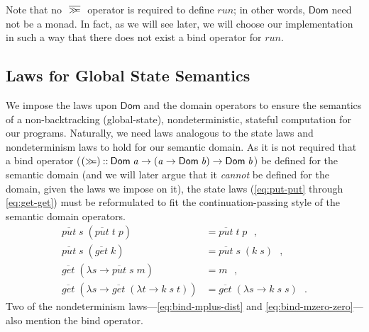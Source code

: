 \documentclass{jfp}
\newcommand{\Conid}[1]{\mathit{#1}}
\newcommand{\Varid}[1]{\mathit{#1}}
\let\Varid\mathit
\let\Conid\mathsf
\begin{document}
Note that no \ensuremath{~\overline{\hstretch{0.7}{>\!\!>\!\!=}}~} operator is required to define \ensuremath{\Varid{run}};
in other words, \ensuremath{\Conid{Dom}} need not be a monad.
In fact, as we will see later, we will choose our implementation in such a way
that there does not exist a bind operator for \ensuremath{\Varid{run}}.

\subsection{Laws for Global State Semantics}
\label{sec:model-global-state-sem}
We impose the laws upon \ensuremath{\Conid{Dom}} and the domain operators to ensure the semantics of a
non-backtracking (global-state),
nondeterministic, stateful computation for our programs.
Naturally, we need laws analogous to the state laws and nondeterminism laws to
hold for our semantic domain.
As it is not required that a bind operator
(\ensuremath{(\mathrel{\hstretch{0.7}{>\!\!>\!\!=}})\mathbin{::}\Conid{Dom}\;\Varid{a}\to (\Varid{a}\to \Conid{Dom}\;\Varid{b})\to \Conid{Dom}\;\Varid{b}}) be defined for the semantic
domain (and we will later argue that it \emph{cannot} be defined for the domain,
given the laws we impose on it), the state laws
(\eqref{eq:put-put} through \eqref{eq:get-get})
must be reformulated to fit the continuation-passing style of the semantic domain
operators.
\begin{align}
  \ensuremath{\overline{\Varid{put}}\;\Varid{s}\;(\overline{\Varid{put}}\;\Varid{t}\;\Varid{p})} &= \ensuremath{\overline{\Varid{put}}\;\Varid{t}\;\Varid{p}} \mbox{~~,} \label{eq:put-put-g-d} \\
  \ensuremath{\overline{\Varid{put}}\;\Varid{s}\;(\overline{\Varid{get}}\;\Varid{k})} &= \ensuremath{\overline{\Varid{put}}\;\Varid{s}\;(\Varid{k}\;\Varid{s})} \mbox{~~,} \label{eq:put-get-g-d} \\
  \ensuremath{\overline{\Varid{get}}\;(\lambda \Varid{s}\to \overline{\Varid{put}}\;\Varid{s}\;\Varid{m})} &= \ensuremath{\Varid{m}} \mbox{~~,} \label{eq:get-put-g-d} \\
  \ensuremath{\overline{\Varid{get}}\;(\lambda \Varid{s}\to \overline{\Varid{get}}\;(\lambda \Varid{t}\to \Varid{k}\;\Varid{s}\;\Varid{t}))} &= \ensuremath{\overline{\Varid{get}}\;(\lambda \Varid{s}\to \Varid{k}\;\Varid{s}\;\Varid{s})} \mbox{~~.} \label{eq:get-get-g-d}
\end{align}
Two of the nondeterminism
laws---\eqref{eq:bind-mplus-dist} and
\eqref{eq:bind-mzero-zero}---also mention the bind operator.
\end{document}
